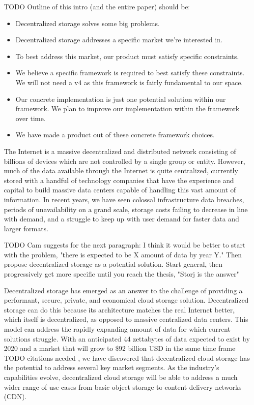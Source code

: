\documentclass[11pt,fleqn,openany]{book}
\newcommand{\todo}[1]{{\color{red} TODO #1 }}
\begin{document}
\todo{
Outline of this intro (and the entire paper) should be:
\begin{itemize}
\item Decentralized storage solves some big problems.
\item Decentralized storage addresses a specific market we're interested in.
\item To best address this market, our product must satisfy specific constraints.
\item We believe a specific framework is required to best satisfy these
  constraints. We will not need a v4 as this framework is fairly fundamental
  to our space.
\item Our concrete implementation is just one potential solution within our
  framework. We plan to improve our implementation within the framework over
  time.
\item We have made a product out of these concrete framework choices.
\end{itemize}
}

The Internet is a massive decentralized and distributed network consisting of
billions of devices which are not controlled by a single group or entity.
However, much of the data available through the Internet is quite centralized,
currently stored with a handful of technology companies that have the
experience and capital to build massive data centers capable of handling this
vast amount of information.
In recent years, we have seen colossal infrastructure data breaches, periods of
unavailability on a grand scale, storage costs failing to decrease in line with
demand, and a struggle to keep up with user demand for faster data and larger
formats.

\todo{Cam suggests for the next paragraph:
I think it would be better to start with the problem, "there is expected to be X amount of data by year Y." Then propose decentralized storage as a potential solution. Start general, then progressively get more specific until you reach the thesis, "Storj is the answer"
}

Decentralized storage has emerged as an answer to the challenge of
providing a performant, secure, private, and economical cloud storage solution.
Decentralized storage can do this because its architecture matches the real
Internet better, which itself is decentralized, as opposed to massive
centralized data centers. This model can address the rapidly
expanding amount of data for which current solutions struggle.
With an anticipated 44 zettabytes of data expected to exist by 2020 and a
market that will grow to \$92 billion USD in the same time frame
\todo{citations needed}, we have discovered that decentralized cloud storage
has the potential to address several key market segments.
As the industry's capabilities evolve, decentralized cloud
storage will be able to address a much wider range of use cases from basic
object storage to content delivery networks (CDN).
\end{document}
